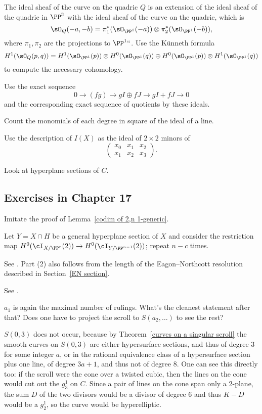 The ideal sheaf of the curve on the quadric $Q$ is an extension
of the ideal sheaf of the quadric in $\PP^3$
with the ideal sheaf of the curve on the quadric, which is
$$
\sO_Q(-a,-b) = \pi_1^*(\sO_{\PP^1}(-a)) \otimes \pi_2^*(\sO_{\PP^1}(-b)),
$$
where $\pi_1, \pi_2$ are the projections to $\PP^1` `$. Use the
%
K\"unneth formula
$$
H^1(\sO_Q(p,q)) = H^1(\sO_{\PP^1}(p)) \otimes H^0(\sO_{\PP^1}(q)) \oplus
H^0(\sO_{\PP^1}(p)) \otimes H^1(\sO_{\PP^1}(q))
$$
to compute the necessary cohomology.

Use the exact sequence
$$
0\to (fg) \to gI \oplus fJ \to gI+fJ \to 0
$$
and the corresponding exact sequence of quotients by these ideals.

Count the monomials of each degree in square of the ideal of a line.

Use the description of $I(X)$ as the ideal of $2\times 2$ minors of
$$
\begin{pmatrix}
x_0 &x_1&x_2\\
x_1& x_2& x_3
\end{pmatrix}
.
$$

Look at hyperplane sections of $C$.

\subsection*{Exercises in Chapter 17\nopunct}

Imitate the proof of Lemma~\ref{codim of 2,n 1-generic}.

Let $Y = X \cap H$ be a general hyperplane section of $X$
and consider the restriction map $H^0(\cI_{X/\PP^r}(2)) \to
H^0(\cI_{Y/\PP^{n-1}}(2))$; repeat $n-c$ times.

See \cite[Section V.1]{Hartshorne1977}.
Part (2) also follows from
the length of the 
%
Eagon--Northcott resolution
described in Section~\ref{EN section}.

See \cite[Section 3c]{MR685427}.

$a_1$ is again the maximal number of rulings. What's the cleanest
statement after that? Does one have
to project the scroll to $S(a_2, \dots)$ to see the rest?

$S(0,3)$ does not occur, because by Theorem~\ref{curves on a
singular scroll} the smooth curves on $S(0,3)$ are either hypersurface
sections, and thus of degree $3$ for
some integer $a$, or in the rational equivalence class of a hypersurface
section plus one line,
of degree $3a+1$, and thus not of degree 8. One can see this directly too:
if the scroll were the cone over
a twisted cubic, then the lines on the cone would cut out the $g^1_3$
on $C$. Since a pair of lines on the cone span
only a 2-plane, the sum $D$ of the two divisors would be a divisor of
degree 6  and thus $K-D$ would be a $g^1_2$,
so the curve would be hyperelliptic.

